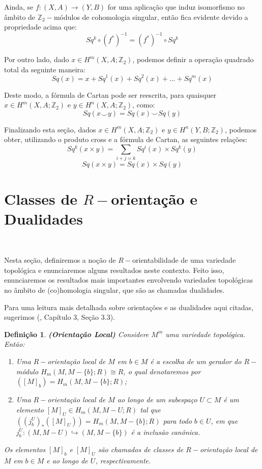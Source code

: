 \documentclass[12pt,oneside]{book} %
\newtheorem{defi}   {\hspace{0.5cm}Defini\c c\~ao}[chapter]
\newcommand{\ds}{\displaystyle}
\newcommand{\Z}{\mathbb{Z}}
\newcommand{\ccup}{\smile}
\begin{document}
\par Ainda, se $f:(X,A)\to (Y,B)$ for uma aplicação que induz isomorfismo no âmbito de $\Z_{2}-$módulos de cohomologia singular, então fica evidente devido a propriedade acima que:
$$ Sq^{k}\circ(f^{*})^{-1}=(f^{*})^{-1}\circ Sq^{k} $$

\par Por outro lado, dado $x\in H^{m}(X,A;\Z_{2})$, podemos definir a operação quadrado total da seguinte maneira:
$$ Sq(x)=x+Sq^{1}(x)+Sq^{2}(x)+...+Sq^{m}(x) $$

\par Deste modo, a fórmula de Cartan pode ser reescrita, para quaisquer $x\in H^{m}(X,A;\Z_{2})$ e $y\in H^{n}(X,A;\Z_{2})$, como:
$$ Sq(x\ccup y)=Sq(x)\ccup Sq(y) $$

\par Finalizando esta seção, dados $x\in H^{m}(X,A;\Z_{2})$ e $y\in H^{n}(Y,B;\Z_{2})$, podemos obter, utilizando o produto cross e a fórmula de Cartan, as seguintes relações:
$$ Sq^{k}(x\times y)=\ds\sum_{i+j=k}Sq^{i}(x)\times Sq^{k}(y) $$
$$ Sq(x\times y)=Sq(x)\times Sq(y) $$



\section{Classes de $R-$orientação e Dualidades}\label{ap_orient}

\

\par Nesta seção, definiremos a noção de $R-$orientabilidade de uma variedade topológica e enunciaremos alguns resultados neste contexto. Feito isso, enunciaremos os resultados mais importantes envolvendo variedades topológicas no âmbito de (co)homologia singular, que são as chamadas dualidades.

\par Para uma leitura mais detalhada sobre orientações e as dualidades aqui citadas, sugerimos (\cite{hatcher}, Capítulo 3, Seção 3.3).

\begin{defi}{\bf (Orientação Local)}
	Considere $M^{m}$ uma variedade topológica. Então:
	\begin{enumerate}
		\item Uma $R-$orientação local de $M$ em $b\in M$ é a escolha de um gerador do $R-$módulo $H_{m}(M,M-\{b\};R)\cong R$, o qual denotaremos por $([M]_{b})=H_{m}(M,M-\{b\};R)$;
		\item Uma $R-$orientação local de $M$ ao longo de um subespaço $U\subset M$ é um elemento $[M]_{U}\in H_{m}(M,M-U;R)$ tal que $((j_{b}^{U})_{*}([M]_{U}))=H_{m}(M,M-\{b\};R)$ para todo $b\in U$, em que $j_{b}^{U}:(M,M-U)\hookrightarrow (M,M-\{b\})$ é a inclusão canônica.
	\end{enumerate}
	
	\par Os elementos $[M]_{b}$ e $[M]_{U}$ são chamados de classes de $R-$orientação local de $M$ em $b\in M$ e ao longo de $U$, respectivamente.
\end{defi}
\end{document}
